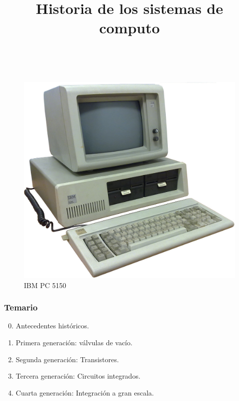 \documentclass[11pt,a4paper,spanish]{beamer}
\title{Historia de los sistemas de computo}
\author{}
\date{}
\begin{document}
\begin{frame}[noframenumbering]

    \maketitle
    \centering
    \vspace{-8em}~
    \begin{figure}
    \includegraphics[height=0.65\textheight]{img/ibm-pc-5150.jpg}
        \captionsetup{textfont=tiny,labelformat=empty}
        \caption{IBM PC 5150 \ccbysa\cite{ibm-pc-5150}}
    \end{figure}

\end{frame}

\begin{frame}

    \frametitle{Temario}

\begin{enumerate}

    \setcounter{enumi}{-1}

    \item Antecedentes históricos.

    \item Primera generación: válvulas de vacío.

    \item Segunda generación: Transistores.

    \item Tercera generación: Circuitos integrados.

    \item Cuarta generación: Integración a gran escala.

\end{enumerate}

\end{frame}
\end{document}
